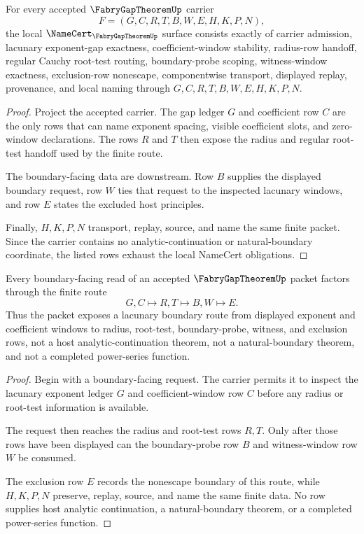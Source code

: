 \begin{theorem}
\label{thm:fabry-gap-theorem-namecert-obligations}
For every accepted $\FabryGapTheoremUp$ carrier
$$
F=(G,C,R,T,B,W,E,H,K,P,N),
$$
the local $\NameCert_{\FabryGapTheoremUp}$ surface consists exactly of carrier admission, lacunary exponent-gap exactness, coefficient-window stability, radius-row handoff, regular Cauchy root-test routing, boundary-probe scoping, witness-window exactness, exclusion-row nonescape, componentwise transport, displayed replay, provenance, and local naming through $G,C,R,T,B,W,E,H,K,P,N$.
\end{theorem}
\begin{proof}
Project the accepted carrier. The gap ledger $G$ and coefficient row $C$ are the only rows that can name exponent spacing, visible coefficient slots, and zero-window declarations. The rows $R$ and $T$ then expose the radius and regular root-test handoff used by the finite route.

The boundary-facing data are downstream. Row $B$ supplies the displayed boundary request, row $W$ ties that request to the inspected lacunary windows, and row $E$ states the excluded host principles.

Finally, $H,K,P,N$ transport, replay, source, and name the same finite packet. Since the carrier contains no analytic-continuation or natural-boundary coordinate, the listed rows exhaust the local NameCert obligations.
\end{proof}

\begin{theorem}
\label{thm:fabry-gap-theorem-lacunary-boundary-route}
Every boundary-facing read of an accepted $\FabryGapTheoremUp$ packet factors through the finite route
$$
G,C \longmapsto R,T \longmapsto B,W \longmapsto E .
$$
Thus the packet exposes a lacunary boundary route from displayed exponent and coefficient windows to radius, root-test, boundary-probe, witness, and exclusion rows, not a host analytic-continuation theorem, not a natural-boundary theorem, and not a completed power-series function.
\end{theorem}
\begin{proof}
Begin with a boundary-facing request. The carrier permits it to inspect the lacunary exponent ledger $G$ and coefficient-window row $C$ before any radius or root-test information is available.

The request then reaches the radius and root-test rows $R,T$. Only after those rows have been displayed can the boundary-probe row $B$ and witness-window row $W$ be consumed.

The exclusion row $E$ records the nonescape boundary of this route, while $H,K,P,N$ preserve, replay, source, and name the same finite data. No row supplies host analytic continuation, a natural-boundary theorem, or a completed power-series function.
\end{proof}

